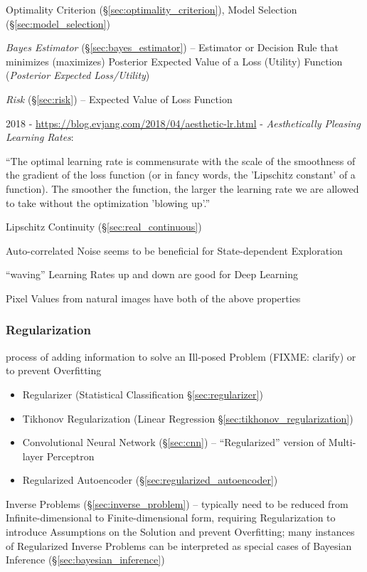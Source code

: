 \fist Optimality Criterion (\S\ref{sec:optimality_criterion}), Model Selection
(\S\ref{sec:model_selection})

\fist \emph{Bayes Estimator} (\S\ref{sec:bayes_estimator}) -- Estimator or
Decision Rule that minimizes (maximizes) Posterior Expected Value of a Loss
(Utility) Function (\emph{Posterior Expected Loss/Utility})

\fist \emph{Risk} (\S\ref{sec:risk}) -- Expected Value of Loss Function

2018 - \url{https://blog.evjang.com/2018/04/aesthetic-lr.html} - \emph{Aesthetically
  Pleasing Learning Rates}:

``The optimal learning rate is commensurate with the scale of the smoothness of
the gradient of the loss function (or in fancy words, the 'Lipschitz constant'
of a function). The smoother the function, the larger the learning rate we are
allowed to take without the optimization 'blowing up'.''

\fist Lipschitz Continuity (\S\ref{sec:real_continuous})

Auto-correlated Noise seems to be beneficial for State-dependent Exploration

``waving'' Learning Rates up and down are good for Deep Learning

Pixel Values from natural images have both of the above properties



\subsubsection{Regularization}\label{sec:regularization}

process of adding information to solve an Ill-posed Problem (FIXME: clarify) or
to prevent Overfitting

\begin{itemize}
  \item Regularizer (Statistical Classification \S\ref{sec:regularizer})
  \item Tikhonov Regularization (Linear Regression
    \S\ref{sec:tikhonov_regularization})
  \item Convolutional Neural Network (\S\ref{sec:cnn}) -- ``Regularized''
    version of Multi-layer Perceptron
  \item Regularized Autoencoder (\S\ref{sec:regularized_autoencoder})
\end{itemize}

\fist Inverse Problems (\S\ref{sec:inverse_problem}) -- typically need to be
reduced from Infinite-dimensional to Finite-dimensional form, requiring
Regularization to introduce Assumptions on the Solution and prevent Overfitting;
many instances of Regularized Inverse Problems can be interpreted as special
cases of Bayesian Inference (\S\ref{sec:bayesian_inference})



